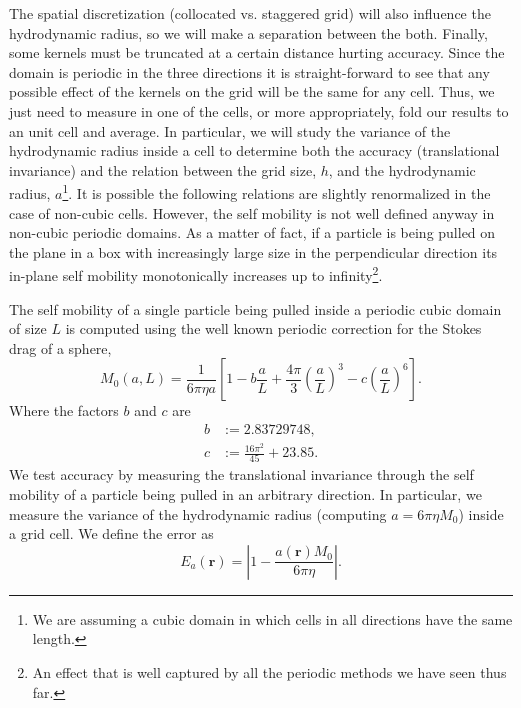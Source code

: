 \documentclass[ twoside,openright,titlepage,numbers=noenddot,%
headinclude,footinclude,cleardoublepage=empty,abstract=on,
BCOR=5mm,paper=a4,fontsize=11pt, dvipsnames
]{scrreprt}
\renewcommand{\vec}[1]{\bm{#1}}
\begin{document}
The spatial discretization (collocated vs. staggered grid) will also influence the hydrodynamic radius, so we will make a separation between the both.
Finally, some kernels must be truncated at a certain distance hurting accuracy.
Since the domain is periodic in the three directions it is straight-forward to see that any possible effect of the kernels on the grid will be the same for any cell. Thus, we just need to measure in one of the cells, or more appropriately, fold our results to an unit cell and average.
In particular, we will study the variance of the hydrodynamic radius inside a cell to determine both the accuracy (translational invariance) and the relation between the grid size, $h$, and the hydrodynamic radius, $a$\footnote{We are assuming a cubic domain in which cells in all directions have the same length.}. It is possible the following relations are slightly renormalized in the case of non-cubic cells. However, the self mobility is not well defined anyway in non-cubic periodic domains. As a matter of fact, if a particle is being pulled on the plane in a box with increasingly large size in the perpendicular direction its in-plane self mobility monotonically increases up to infinity\cite{Vogele2016}\footnote{An effect that is well captured by all the periodic methods we have seen thus far.}.

The self mobility of a single particle being pulled inside a periodic cubic domain of size $L$ is computed using the well known periodic correction for the Stokes drag of a sphere\cite{Hasimoto1959},
\begin{equation}
  M_{0}(a,L) = \frac{1}{6\pi\eta a}\left[1-b\frac{a}{L} + \frac{4\pi}{3}\left(\frac{a}{L}\right)^3 - c \left(\frac{a}{L}\right)^6\right].
\end{equation}
Where the factors $b$ and $c$ are
\begin{equation}
  \begin{aligned}
  b &:= 2.83729748,\\
  c &:= \frac{16\pi^2}{45} + 23.85.
  \end{aligned}
\end{equation}
We test accuracy by measuring the translational invariance through the self mobility of a particle being pulled in an arbitrary direction. In particular, we measure the variance of the hydrodynamic radius (computing $a = 6\pi\eta M_{0}$) inside a grid cell.
We define the error as
\begin{equation}
  \label{hydroerr}
  E_a(\vec{r}) = \left|1 - \frac{a(\vec{r})M_{0}}{6\pi\eta}\right|.
\end{equation}
\end{document}
